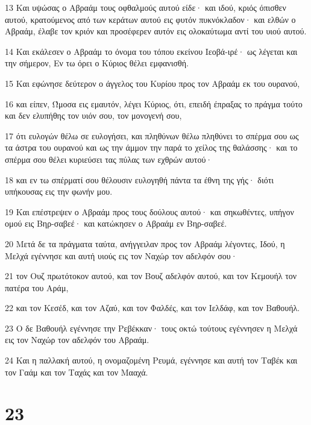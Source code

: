 \par 13 Και υψώσας ο Αβραάμ τους οφθαλμούς αυτού είδε· και ιδού, κριός όπισθεν αυτού, κρατούμενος από των κεράτων αυτού εις φυτόν πυκνόκλαδον· και ελθών ο Αβραάμ, έλαβε τον κριόν και προσέφερεν αυτόν εις ολοκαύτωμα αντί του υιού αυτού.
\par 14 Και εκάλεσεν ο Αβραάμ το όνομα του τόπου εκείνου Ιεοβά-ιρέ· ως λέγεται και την σήμερον, Εν τω όρει ο Κύριος θέλει εμφανισθή.
\par 15 Και εφώνησε δεύτερον ο άγγελος του Κυρίου προς τον Αβραάμ εκ του ουρανού,
\par 16 και είπεν, Ώμοσα εις εμαυτόν, λέγει Κύριος, ότι, επειδή έπραξας το πράγμα τούτο και δεν ελυπήθης τον υιόν σου, τον μονογενή σου,
\par 17 ότι ευλογών θέλω σε ευλογήσει, και πληθύνων θέλω πληθύνει το σπέρμα σου ως τα άστρα του ουρανού και ως την άμμον την παρά το χείλος της θαλάσσης· και το σπέρμα σου θέλει κυριεύσει τας πύλας των εχθρών αυτού·
\par 18 και εν τω σπέρματί σου θέλουσιν ευλογηθή πάντα τα έθνη της γής· διότι υπήκουσας εις την φωνήν μου.
\par 19 Και επέστρεψεν ο Αβραάμ προς τους δούλους αυτού· και σηκωθέντες, υπήγον ομού εις Βηρ-σαβεέ· και κατώκησεν ο Αβραάμ εν Βηρ-σαβεέ.
\par 20 Μετά δε τα πράγματα ταύτα, ανήγγειλαν προς τον Αβραάμ λέγοντες, Ιδού, η Μελχά εγέννησε και αυτή υιούς εις τον Ναχώρ τον αδελφόν σου·
\par 21 τον Ουζ πρωτότοκον αυτού, και τον Βουζ αδελφόν αυτού, και τον Κεμουήλ τον πατέρα του Αράμ,
\par 22 και τον Κεσέδ, και τον Αζαύ, και τον Φαλδές, και τον Ιελδάφ, και τον Βαθουήλ.
\par 23 Ο δε Βαθουήλ εγέννησε την Ρεβέκκαν· τους οκτώ τούτους εγέννησεν η Μελχά εις τον Ναχώρ τον αδελφόν του Αβραάμ.
\par 24 Και η παλλακή αυτού, η ονομαζομένη Ρευμά, εγέννησε και αυτή τον Ταβέκ και τον Γαάμ και τον Ταχάς και τον Μααχά.

\chapter{23}

